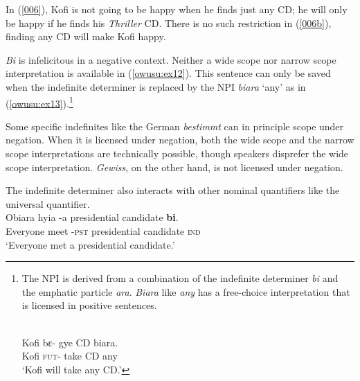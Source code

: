 \documentclass[output=paper,modfonts,nonflat,draftmode]{langsci/langscibook}
\begin{document}
In (\ref{006}), Kofi is not going to be happy when he finds just any CD; he will only be happy if he finds his \emph{Thriller} CD. There is no such restriction in (\ref{006b}), finding any CD will make Kofi happy.

\emph{Bi} is infelicitous in a negative context. Neither a wide scope nor narrow scope interpretation is available in (\ref{owusu:ex12}). This sentence can only be saved when the indefinite determiner is replaced by the NPI \emph{biara} `any' as in (\ref{owusu:ex13}).\footnote{The NPI is derived from a combination of the indefinite determiner \emph{bi} and the emphatic particle \emph{ara}. \emph{Biara} like \emph{any} has a free-choice interpretation that is licensed in positive sentences.

\ea
{}\\
\label{owusu:ex120}
\gll  Kofi  bε- gye CD biara.\\
Kofi \textsc{fut}-  take CD any \\
\glt `Kofi will take any CD.'
\z 
}  
\ea
{}\\


\z \z 

Some specific indefinites like the German \emph{bestimmt} can in principle scope under negation. When it is licensed under negation, both the wide scope and the narrow scope interpretations are technically possible, though speakers disprefer the wide scope interpretation. \emph{Gewiss}, on the other hand, is not licensed under negation.

The indefinite determiner also interacts with other nominal quantifiers like the universal quantifier. 
\ea 
{}\\
  \ea\label{owusu:ex100}
\gll Obiara hyia -a presidential candidate  \textbf{bi}. \\
    Everyone meet -\textsc{pst} presidential candidate \textsc{ind} \\
\glt `Everyone met a presidential candidate.'
\end{document}
